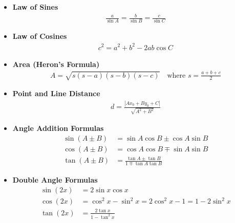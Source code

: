 \begin{itemize}
    \item \textbf{Law of Sines} \\
    \begin{equation*}
    \begin{aligned}
    \frac{a}{\sin A} = \frac{b}{\sin B} = \frac{c}{\sin C}
    \end{aligned}
    \end{equation*}

    \item \textbf{Law of Cosines} \\ 
    \begin{equation*}
    \begin{aligned}
    c^2 = a^2 + b^2 - 2ab \cos C
    \end{aligned}
    \end{equation*}

    \item \textbf{Area (Heron's Formula)} \\ 
    \begin{equation*}
    \begin{aligned}
    A = \sqrt{s(s-a)(s-b)(s-c)} \quad \text{where } s = \frac{a+b+c}{2}
    \end{aligned}
    \end{equation*}

    \item \textbf{Point and Line Distance} \\ 
    \begin{equation*}
    \begin{aligned}
    d = \frac{|Ax_0 + By_0 + C|}{\sqrt{A^2 + B^2}}
    \end{aligned}
    \end{equation*}

    \item \textbf{Angle Addition Formulas} \\
    \begin{equation*}
    \begin{aligned}
    \sin(A \pm B) &= \sin A \cos B \pm \cos A \sin B \\
\cos(A \pm B) &= \cos A \cos B \mp \sin A \sin B \\
\tan(A \pm B) &= \frac{\tan A \pm \tan B}{1 \mp \tan A \tan B}
    \end{aligned}
    \end{equation*}

    \item \textbf{Double Angle Formulas} \\ 
    \begin{equation*}
    \begin{aligned}
    \sin(2x) &= 2\sin x \cos x \\
\cos(2x) &= \cos^2 x - \sin^2 x = 2\cos^2 x - 1 = 1 - 2\sin^2 x \\
\tan(2x) &= \frac{2\tan x}{1 - \tan^2 x}
    \end{aligned}
    \end{equation*} 


\end{itemize}

